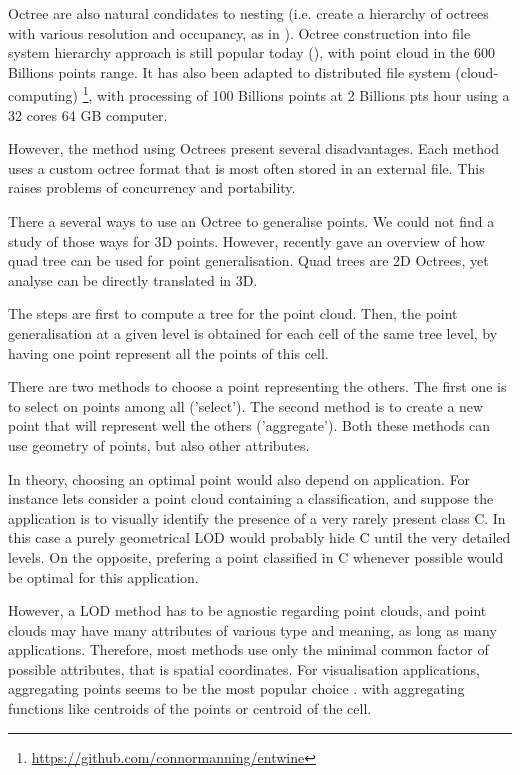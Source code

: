 	Octree are also natural condidates to nesting (i.e. create a hierarchy of octrees with various resolution and occupancy, as in \cite{Hornung2013}).
   	Octree construction into file system hierarchy approach is still popular today (\cite{OscarMartinez-Rubi2015}), with point cloud in the 600 Billions points range.
   	It has also been adapted to distributed file system (cloud-computing)  \footnote{\url{https://github.com/connormanning/entwine}}, with processing of 100 Billions points at 2 Billions pts \per hour using a 32 cores 64 GB computer.
	
	
	However, the method using Octrees present several disadvantages. 
	Each method uses a custom octree format that is most often stored in an external file.
	This raises problems of concurrency and portability. 

	There a several ways to use an Octree to generalise points.
	We could not find a study of those ways for 3D points. 
	However, \cite{Bereuter2015} recently gave an overview of how quad tree can be used for point generalisation.
	Quad trees are 2D Octrees, yet \cite{Bereuter2015} analyse can be directly translated in 3D. 
 
	The steps are first to compute a tree for the point cloud.
	Then, the point generalisation at a given level is obtained for each cell of the same tree level, by having one point represent all the points of this cell.
	
	There are two methods to choose a point representing the others. The first one is to select on points among all ('select').
	The second method is to create a new point that will represent well the others ('aggregate'). 
	Both these methods can use geometry of points, but also other attributes.
	
	In theory, choosing an optimal point would also depend on application.
	For instance lets consider a point cloud containing a classification, and suppose the application is to visually identify the presence of a very rarely present class C.
	In this case a purely geometrical LOD would probably hide C until the very detailed levels. On the opposite, prefering a point classified in C whenever possible would be optimal for this application.
	
	However, a LOD method has to be agnostic regarding point clouds,
	and point clouds may have many attributes of various type and meaning, as long as many applications.
	Therefore, most methods use only the minimal common factor of possible attributes, that is spatial coordinates. 
	For visualisation applications, aggregating points seems to be the most popular choice \cite{Schutz2015,Hornung2013,Elseberg2013}. with aggregating functions like centroids of the points or centroid of the cell.
	
